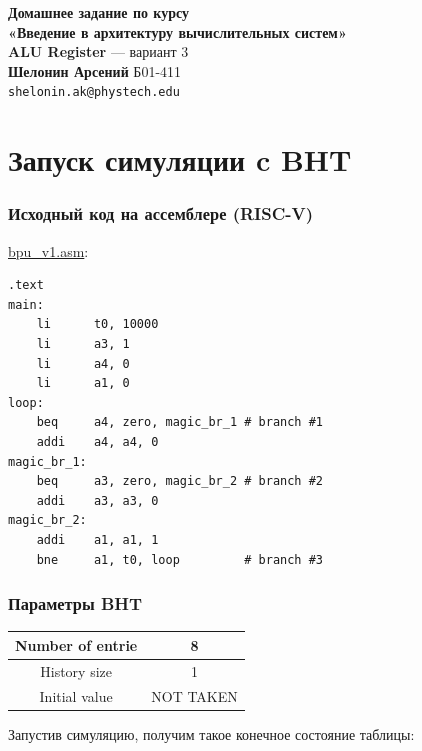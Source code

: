 \documentclass[14pt,a4paper]{extarticle}
\begin{document}
\begin{center}
    {\Large \textbf{Домашнее задание по курсу \\ «Введение в архитектуру вычислительных систем»}} \\[0.3cm]
    {\large \textbf{ALU Register} --- вариант 3} \\[1cm]
    
    \textbf{Шелонин Арсений} Б01-411 \\
    \texttt{shelonin.ak@phystech.edu}
\end{center}

\tableofcontents
\newpage

\section{Запуск симуляции c BHT}

\subsubsection*{Исходный код на ассемблере (RISC-V)}

\href{run:../bpu_v1.asm}{bpu\_v1.asm}:

\begin{verbatim}
.text
main:
    li      t0, 10000
    li      a3, 1
    li      a4, 0
    li      a1, 0
loop:
    beq     a4, zero, magic_br_1 # branch #1
    addi    a4, a4, 0
magic_br_1:
    beq     a3, zero, magic_br_2 # branch #2
    addi    a3, a3, 0
magic_br_2:
    addi    a1, a1, 1
    bne     a1, t0, loop         # branch #3

\end{verbatim}

\subsubsection*{Параметры BHT}

\begin{table}[h]
    \begin{tabular}{|c|c|}
        \hline
        Number of entrie  & 8 \\
        \hline
        History size & 1 \\
        \hline
        Initial value & NOT TAKEN \\
        \hline
    \end{tabular}
    \label{tab:three_cols}
\end{table}

Запустив симуляцию, получим такое конечное состояние таблицы:
\end{document}
